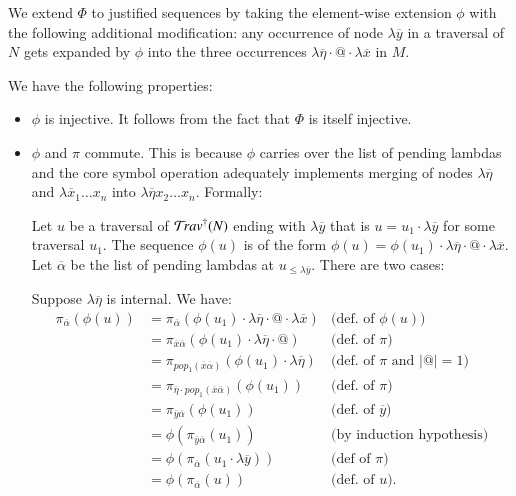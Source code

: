 \documentclass{elsarticle}
\theoremstyle{plain}
\theoremstyle{definition}
\def\coresymbol{\pi} %
\begin{document}
\begin{description}
    We extend $\Phi$ to justified sequences by taking the element-wise extension $\phi$ with the following additional modification: any occurrence of node $\lambda\overline{y}$ in a traversal of $N$ gets expanded by $\phi$ into the three occurrences $\lambda\overline\eta \cdot @ \cdot \lambda\overline{x}$ in $M$.

    We have the following properties:
    \begin{itemize}
    \item $\phi$ is injective. It follows from the fact that $\Phi$ is itself injective.

    \item $\phi$ and $\coresymbol$ commute. This is because $\phi$ carries over the list of pending lambdas and the core symbol operation adequately implements merging of nodes $\lambda\overline\eta$ and
    $\lambda\overline x_1 \ldots x_n$ into
    $\lambda\overline\eta x_2 \ldots x_n$. Formally:

    Let $u$ be a traversal of $\mathcal{T}\!rav^\dagger(N)$
    ending with $\lambda\overline{y}$ that is
    $u = u_1 \cdot \lambda\overline{y} $ for some traversal $u_1$.
    The sequence $\phi(u)$ is of the form
    $\phi(u) = \phi(u_1) \cdot \lambda\overline{\eta} \cdot @ \cdot \lambda\overline{x}$. Let $\overline\alpha$ be the list of pending lambdas at $u_{\leq \lambda\overline{y}}$. There are two cases:

    Suppose $\lambda\overline\eta$ is internal. We have:
    \begin{align*}
        \coresymbol_{\overline\alpha}(\phi(u))
        &=  \coresymbol_{\overline\alpha}(\phi(u_1) \cdot \lambda\overline{\eta} \cdot @ \cdot \lambda\overline{x})
            & \mbox{(def.~of $\phi(u)$)}
        \\
        &=  \coresymbol_{\overline{x}\overline\alpha}(\phi(u_1) \cdot
        \lambda\overline\eta \cdot @)
            & \mbox{(def.~of $\coresymbol$)}
        \\
        &=  \coresymbol_{pop_1(\overline{x}\overline\alpha)}(\phi(u_1) \cdot
        \lambda\overline{\eta})
            & \mbox{(def.~of $\coresymbol$ and $|@|=1$)}
        \\
        &=  \coresymbol_{\overline\eta \cdot pop_1(\overline{x}\overline\alpha)}(\phi(u_1))
            & \mbox{(def.~of $\coresymbol$)}
        \\
        &=  \coresymbol_{\overline{y}\overline\alpha}(\phi(u_1))
            & \mbox{(def.~of $\overline{y}$)}
        \\
        &=  \phi(\coresymbol_{\overline{y}\overline\alpha}(u_1))
            & \mbox{(by induction hypothesis)}
        \\
        &= \phi(\coresymbol_{\overline\alpha}(u_1 \cdot \lambda\overline{y})) & \mbox{(def of $\coresymbol$)} \\
        &=  \phi(\coresymbol_{\overline\alpha}(u))
            & \mbox{(def.~of $u$).}
    \end{align*}


\end{itemize}
\end{description}
\end{document}
